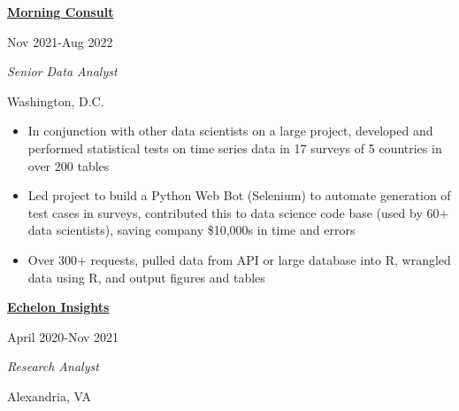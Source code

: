 \documentclass[
  16,
]{article}
\providecommand{\tightlist}{%
  \setlength{\itemsep}{0pt}\setlength{\parskip}{0pt}}\usepackage{longtable,booktabs,array}
\begin{document}
\begin{large}
  \begin{multicols}{2}
    \begin{flushleft}{\bf \href{https://morningconsult.com/}{Morning Consult}}\end{flushleft}
    \begin{flushright}Nov 2021-Aug 2022\end{flushright}
  \end{multicols}
  \vspace{-0.17cm}
  \begin{multicols}{2}
    \begin{flushleft}\textit{Senior Data Analyst}\end
    {flushleft}\begin{flushright}Washington, D.C.\end
    {flushright}
  \end{multicols}
\end{large}
\vspace{-0.16cm}

\begin{itemize}
\tightlist
\item
  In conjunction with other data scientists on a large project,
  developed and performed statistical tests on time series data in 17
  surveys of 5 countries in over 200 tables
\item
  Led project to build a Python Web Bot (Selenium) to automate
  generation of test cases in surveys, contributed this to data science
  code base (used by 60+ data scientists), saving company \$10,000s in
  time and errors
\item
  Over 300+ requests, pulled data from API or large database into R,
  wrangled data using R, and output figures and tables
\end{itemize}

\vspace{7pt}

\begin{large}
  \begin{multicols}{2}
    \begin{flushleft}{\bf \href{https://echeloninsights.com/}{Echelon Insights}}\end{flushleft}
    \begin{flushright}April 2020-Nov 2021\end{flushright}
  \end{multicols}
  \vspace{-0.17cm}
  \begin{multicols}{2}
    \begin{flushleft}\textit{Research Analyst}\end{flushleft}
    \begin{flushright}Alexandria, VA\end{flushright}
  \end{multicols}
\end{large}
\vspace{-0.16cm}
\end{document}
